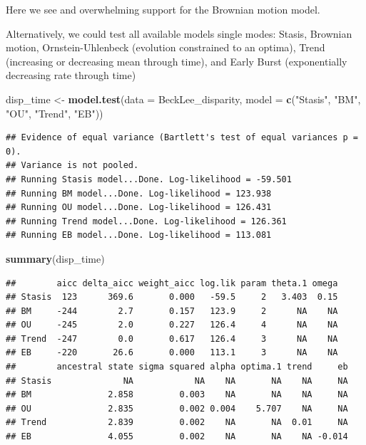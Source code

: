 \documentclass[]{book}
\newenvironment{Shaded}{\begin{snugshade}}{\end{snugshade}}
\newcommand{\KeywordTok}[1]{\textcolor[rgb]{0.13,0.29,0.53}{\textbf{#1}}}
\newcommand{\DataTypeTok}[1]{\textcolor[rgb]{0.13,0.29,0.53}{#1}}
\newcommand{\StringTok}[1]{\textcolor[rgb]{0.31,0.60,0.02}{#1}}
\newcommand{\NormalTok}[1]{#1}
\theoremstyle{definition}
\theoremstyle{definition}
\theoremstyle{definition}
\theoremstyle{remark}
\begin{document}
Here we see and overwhelming support for the Brownian motion model.

Alternatively, we could test all available models single modes: Stasis,
Brownian motion, Ornstein-Uhlenbeck (evolution constrained to an
optima), Trend (increasing or decreasing mean through time), and Early
Burst (exponentially decreasing rate through time)

\begin{Shaded}
\begin{Highlighting}[]
\NormalTok{disp_time <-}\StringTok{ }\KeywordTok{model.test}\NormalTok{(}\DataTypeTok{data =}\NormalTok{ BeckLee_disparity, }\DataTypeTok{model =} \KeywordTok{c}\NormalTok{(}\StringTok{"Stasis"}\NormalTok{, }\StringTok{"BM"}\NormalTok{, }\StringTok{"OU"}\NormalTok{, }\StringTok{"Trend"}\NormalTok{, }\StringTok{"EB"}\NormalTok{))}
\end{Highlighting}
\end{Shaded}

\begin{verbatim}
## Evidence of equal variance (Bartlett's test of equal variances p = 0).
## Variance is not pooled.
## Running Stasis model...Done. Log-likelihood = -59.501
## Running BM model...Done. Log-likelihood = 123.938
## Running OU model...Done. Log-likelihood = 126.431
## Running Trend model...Done. Log-likelihood = 126.361
## Running EB model...Done. Log-likelihood = 113.081
\end{verbatim}

\begin{Shaded}
\begin{Highlighting}[]
\KeywordTok{summary}\NormalTok{(disp_time)}
\end{Highlighting}
\end{Shaded}

\begin{verbatim}
##        aicc delta_aicc weight_aicc log.lik param theta.1 omega
## Stasis  123      369.6       0.000   -59.5     2   3.403  0.15
## BM     -244        2.7       0.157   123.9     2      NA    NA
## OU     -245        2.0       0.227   126.4     4      NA    NA
## Trend  -247        0.0       0.617   126.4     3      NA    NA
## EB     -220       26.6       0.000   113.1     3      NA    NA
##        ancestral state sigma squared alpha optima.1 trend     eb
## Stasis              NA            NA    NA       NA    NA     NA
## BM               2.858         0.003    NA       NA    NA     NA
## OU               2.835         0.002 0.004    5.707    NA     NA
## Trend            2.839         0.002    NA       NA  0.01     NA
## EB               4.055         0.002    NA       NA    NA -0.014
\end{verbatim}
\end{document}
